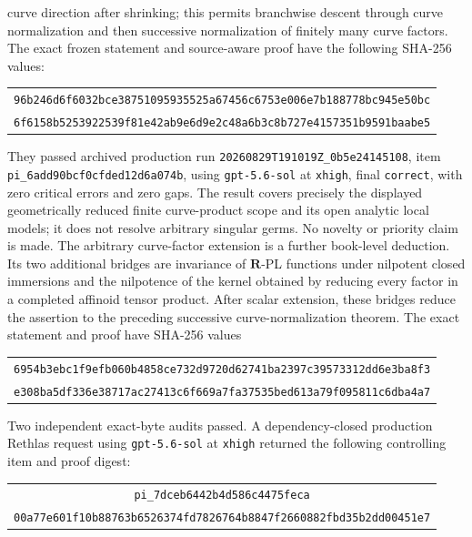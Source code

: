 curve direction after shrinking; this permits branchwise descent through
curve normalization and then successive normalization of finitely many
curve factors.  The exact frozen statement and source-aware proof have the
following SHA-256 values:
\begin{center}
\small
\begin{tabular}{@{}c@{}}
\nolinkurl{96b246d6f6032bce38751095935525a67456c6753e006e7b188778bc945e50bc}\\
\nolinkurl{6f6158b5253922539f81e42ab9e6d9e2c48a6b3c8b727e4157351b9591baabe5}
\end{tabular}
\end{center}
They passed archived production run
\nolinkurl{20260829T191019Z_0b5e24145108}, item
\nolinkurl{pi_6add90bcf0cfded12d6a074b}, using
\texttt{gpt-5.6-sol} at \texttt{xhigh}, final \texttt{correct}, with zero
critical errors and zero gaps.  The result covers precisely the displayed
geometrically reduced finite curve-product scope and its open analytic local
models; it does not resolve arbitrary singular germs.  No novelty or
priority claim is made.
The arbitrary curve-factor extension
 is a further book-level deduction.
Its two additional bridges are invariance of \(\mathbf R\)-PL functions
under nilpotent closed immersions and the nilpotence of the kernel obtained
by reducing every factor in a completed affinoid tensor product.  After
scalar extension, these bridges reduce the assertion to the preceding
successive curve-normalization theorem.  The exact statement and proof have
SHA-256 values
\begin{center}
\small
\begin{tabular}{@{}c@{}}
\nolinkurl{6954b3ebc1f9efb060b4858ce732d9720d62741ba2397c39573312dd6e3ba8f3}\\
\nolinkurl{e308ba5df336e38717ac27413c6f669a7fa37535bed613a79f095811c6dba4a7}
\end{tabular}
\end{center}
Two independent exact-byte audits passed.  A dependency-closed production
Rethlas request using \texttt{gpt-5.6-sol} at \texttt{xhigh} returned the
following controlling item and proof digest:
\begin{center}
\small
\begin{tabular}{@{}c@{}}
\nolinkurl{pi_7dceb6442b4d586c4475feca}\\
\nolinkurl{00a77e601f10b88763b6526374fd7826764b8847f2660882fbd35b2dd00451e7}
\end{tabular}
\end{center}
